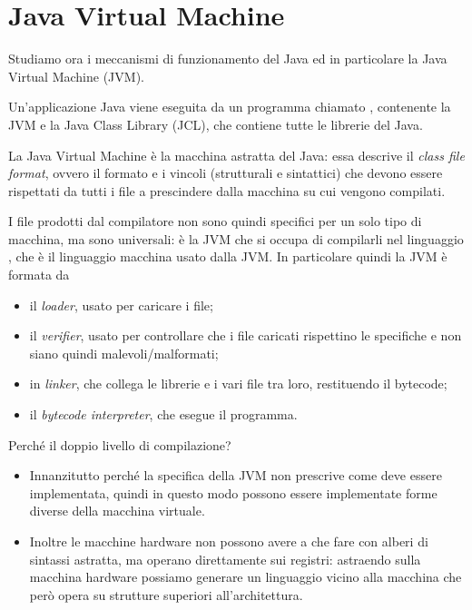 \section{Java Virtual Machine}

Studiamo ora i meccanismi di funzionamento del Java ed in particolare la Java Virtual Machine (JVM).

Un'applicazione Java viene eseguita da un programma chiamato , contenente la JVM e la Java Class Library (JCL), che contiene tutte le librerie del Java.

La Java Virtual Machine è la macchina astratta del Java: essa descrive il \emph{class file format}, ovvero il formato e i vincoli (strutturali e sintattici) che devono essere rispettati da tutti i file  a prescindere dalla macchina su cui vengono compilati.

I file prodotti dal compilatore  non sono quindi specifici per un solo tipo di macchina, ma sono universali: è la JVM che si occupa di compilarli nel linguaggio , che è il linguaggio macchina usato dalla JVM. In particolare quindi la JVM è formata da \begin{itemize}
    \item il \emph{loader}, usato per caricare i file;
    \item il \emph{verifier}, usato per controllare che i file  caricati rispettino le specifiche e non siano quindi malevoli/malformati;
    \item in \emph{linker}, che collega le librerie e i vari file tra loro, restituendo il bytecode;
    \item il \emph{bytecode interpreter}, che esegue il programma.
\end{itemize}

Perché il doppio livello di compilazione?
\begin{itemize}
    \item Innanzitutto perché la specifica della JVM non prescrive come deve essere implementata, quindi in questo modo possono essere implementate forme diverse della macchina virtuale.
    \item Inoltre le macchine hardware non possono avere a che fare con alberi di sintassi astratta, ma operano direttamente sui registri: astraendo sulla macchina hardware possiamo generare un linguaggio vicino alla macchina che però opera su strutture superiori all'architettura.
\end{itemize}

